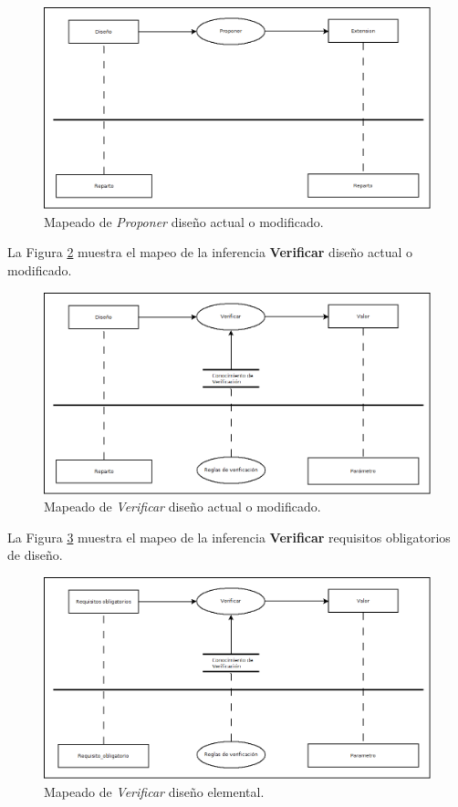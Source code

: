 \begin{figure}[H]
  \centering
  \includegraphics[scale=0.35]{imaxes/DisenoProponerExtension.png}
  \caption{\label{fig:DisenoProponerExtension}Mapeado de \textit{Proponer} diseño actual o modificado.}
\end{figure}

La Figura \ref{fig:DisenoVerificarValor} muestra el mapeo de la inferencia \textbf{Verificar} diseño actual o modificado.

\begin{figure}[H]
  \centering
  \includegraphics[scale=0.35]{imaxes/DisenoVerificarValor.png}
  \caption{\label{fig:DisenoVerificarValor}Mapeado de \textit{Verificar} diseño actual o modificado.}
\end{figure}

La Figura \ref{fig:RequisitosObligatoriosVerificarValor} muestra el mapeo de la inferencia \textbf{Verificar} requisitos obligatorios de diseño.

\begin{figure}[H]
  \centering
  \includegraphics[scale=0.35]{imaxes/RequisitosObligatoriosVerificarValor.png}
  \caption{\label{fig:RequisitosObligatoriosVerificarValor}Mapeado de \textit{Verificar} diseño elemental.}
\end{figure}


